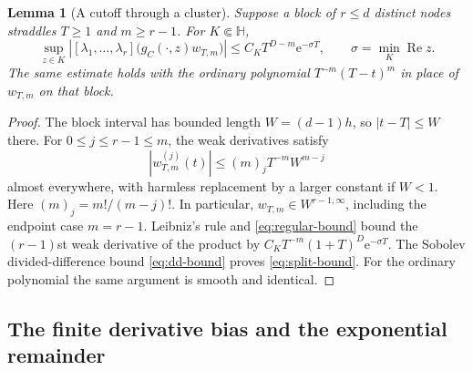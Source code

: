 \documentclass[11pt,a4paper]{article}
\numberwithin{equation}{section}
\newtheorem{lemma}[theorem]{Lemma}
\theoremstyle{definition}
\theoremstyle{remark}
\newcommand{\e}{\mathrm e}
\newcommand{\re}{\operatorname{Re}}
\newcommand{\Hh}{\mathbb H}
\begin{document}
\begin{lemma}[A cutoff through a cluster]
\label{lem:cutoff-cluster}
Suppose a block of $r\le d$ distinct nodes straddles $T\ge1$ and
$m\ge r-1$. For $K\Subset\Hh$,
\begin{equation}
 \sup_{z\in K}
 \left|[\lambda_1,\ldots,\lambda_r]
             \bigl(g_C(\cdot,z)w_{T,m}\bigr)\right|
 \le C_K T^{D-m}\e^{-\sigma T},\qquad \sigma=\min_K\re z.
 \label{eq:split-bound}
\end{equation}
The same estimate holds with the ordinary polynomial
$T^{-m}(T-t)^m$ in place of $w_{T,m}$ on that block.
\end{lemma}
\begin{proof}
The block interval has bounded length $W=(d-1)h$, so $|t-T|\le W$
there. For $0\le j\le r-1\le m$, the weak derivatives satisfy
\[
 |w_{T,m}^{(j)}(t)|
 \le (m)_jT^{-m}W^{m-j}
\]
almost everywhere, with harmless replacement by a larger constant if
$W<1$. Here $(m)_j=m!/(m-j)!$. In particular,
$w_{T,m}\in W^{r-1,\infty}$, including the endpoint case $m=r-1$.
Leibniz's rule and \eqref{eq:regular-bound} bound the $(r-1)$st weak
derivative of the product by
$C_KT^{-m}(1+T)^D\e^{-\sigma T}$. The Sobolev divided-difference
bound \eqref{eq:dd-bound} proves \eqref{eq:split-bound}.
For the ordinary polynomial the same argument is smooth and identical.
\end{proof}

\subsection{The finite derivative bias and the exponential remainder}
\end{document}
